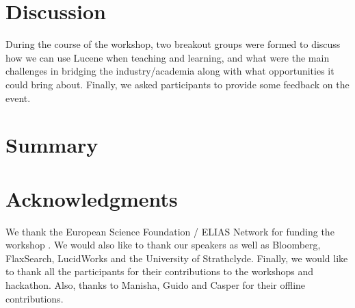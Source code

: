 \documentclass[12pt]{article}
\begin{document}
\begin{sloppypar}


\section{Discussion}
During the course of the workshop, two breakout groups were formed to discuss how we can use Lucene when teaching and learning, and what were the main challenges in bridging the industry/academia along with what opportunities it could bring about. Finally, we asked participants to provide some feedback on the event.










\section{Summary}

\section{Acknowledgments}
We thank the European Science Foundation / ELIAS Network for funding the workshop . We would also like to thank our speakers as well as Bloomberg, FlaxSearch, LucidWorks and the University of Strathclyde. Finally, we would like to thank all the participants for their contributions to the workshops and hackathon. Also, thanks to Manisha, Guido and Casper for their offline contributions.




\end{sloppypar}
\end{document}

